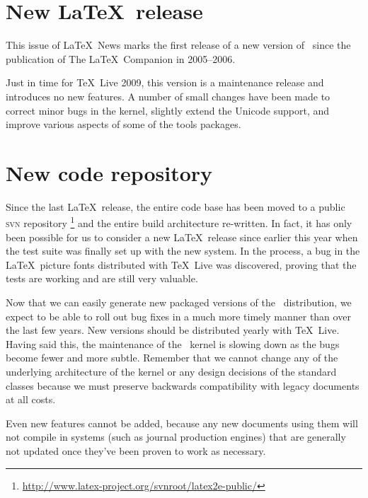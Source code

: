 \documentclass{ltnews}
\begin{document}
\maketitle

\section{New \LaTeX\ release}

This issue of \LaTeX~News marks the first release of a new version of
\LaTeXe\ since the publication of The \LaTeX\ Companion in 2005--2006.

Just in time for \TeX\ Live 2009, this version is a maintenance
release and introduces no new features. A number of small changes have
been made to correct minor bugs in the kernel, slightly extend the Unicode
support, and improve various
aspects of some of the \textsf{tools} packages.

\section{New code repository}

Since the last \LaTeX\ release, the entire code base has been moved
to a public \textsc{svn} repository%
\footnote{\url{http://www.latex-project.org/svnroot/latex2e-public/}}
and the entire build architecture re-written. In fact, it has only
been possible for us to consider a new \LaTeX\ release since earlier
this year when the test suite was finally set up with the new system.
In the process, a bug in the \LaTeX\ picture fonts distributed with
\TeX\ Live was discovered, proving that the
tests are working and are still very valuable.

Now that we can easily generate new packaged versions of the \LaTeXe\
distribution, we expect to be able to roll out bug fixes in a much
more timely manner than over the last few years. New versions should
be distributed yearly with \TeX\ Live. Having said this, the
maintenance of the \LaTeXe\ kernel is slowing down as the bugs become
fewer and more subtle. Remember that we cannot change any of the
underlying architecture of the kernel or any design decisions of the
standard classes because we must preserve backwards compatibility with
legacy documents at all costs.

Even new features cannot be added, because any new documents using
them will not compile in systems (such as journal production engines)
that are generally not updated once they've been proven to work as
necessary.
\end{document}
